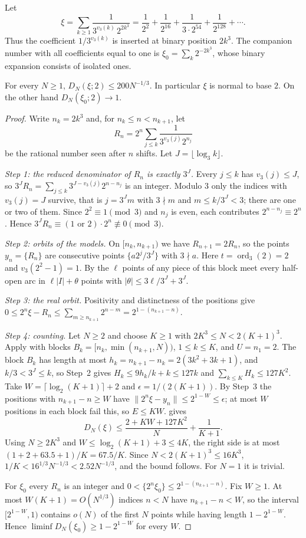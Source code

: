 \documentclass[11pt]{article}
\newcommand{\dist}[1]{\lVert #1\rVert}
\newcommand{\fr}[1]{\{#1\}}
\DeclareMathOperator{\ord}{ord}
\begin{document}
Let
\[
\xi=\sum_{k\ge1}\frac{1}{3^{v_3(k)}\,2^{2k^3}}
=\frac1{2^{2}}+\frac1{2^{16}}+\frac1{3\cdot2^{54}}+\frac1{2^{128}}+\cdots .
\]
Thus the coefficient $1/3^{v_3(k)}$ is inserted at binary position $2k^3$. The companion number
with all coefficients equal to one is $\xi_0=\sum_k2^{-2k^3}$, whose binary expansion consists of
isolated ones.

\begin{theorem}\label{thm:example}
For every $N\ge1$, $D_N(\xi;2)\le200N^{-1/3}$. In particular $\xi$ is normal to base $2$. On the
other hand $D_N(\xi_0;2)\to1$.
\end{theorem}

\begin{proof}
Write $n_k=2k^3$ and, for $n_k\le n<n_{k+1}$, let
\[
R_n=2^n\sum_{j\le k}\frac{1}{3^{v_3(j)}2^{n_j}}
\]
be the rational number seen after $n$ shifts. Let $J=\lfloor\log_3k\rfloor$.

\emph{Step 1: the reduced denominator of $R_n$ is exactly $3^J$.} Every $j\le k$ has
$v_3(j)\le J$, so $3^JR_n=\sum_{j\le k}3^{J-v_3(j)}2^{n-n_j}$ is an integer. Modulo $3$ only the
indices with $v_3(j)=J$ survive, that is $j=3^Jm$ with $3\nmid m$ and $m\le k/3^J<3$; there are one
or two of them. Since $2^2\equiv1\pmod3$ and $n_j$ is even, each contributes $2^{n-n_j}\equiv2^n$.
Hence $3^JR_n\equiv(1\text{ or }2)\cdot2^n\not\equiv0\pmod3$.

\emph{Step 2: orbits of the models.} On $[n_k,n_{k+1})$ we have $R_{n+1}=2R_n$, so the points
$y_n=\fr{R_n}$ are consecutive points $\fr{a2^j/3^J}$ with $3\nmid a$. Here $t=\ord_3(2)=2$ and
$v_3(2^2-1)=1$. By  the $\ell$ points of any piece of this block meet every
half-open arc in $\ell|I|+\theta$ points with $|\theta|\le3\ell/3^J+3^J$.

\emph{Step 3: the real orbit.} Positivity and distinctness of the positions give
$0\le2^n\xi-R_n\le\sum_{m\ge n_{k+1}}2^{n-m}=2^{1-(n_{k+1}-n)}$.

\emph{Step 4: counting.} Let $N\ge2$ and choose $K\ge1$ with $2K^3\le N<2(K+1)^3$. Apply
 with blocks $B_k=[n_k,\min(n_{k+1},N))$, $1\le k\le K$, and $U=n_1=2$. The
block $B_k$ has length at most $h_k=n_{k+1}-n_k=2(3k^2+3k+1)$, and $k/3<3^{J}\le k$, so Step~2 gives
$H_k\le9h_k/k+k\le127k$ and $\sum_{k\le K}H_k\le127K^2$. Take
$W=\lceil\log_2(K+1)\rceil+2$ and $\epsilon=1/(2(K+1))$. By Step~3 the positions with
$n_{k+1}-n\ge W$ have $\dist{2^n\xi-y_n}\le2^{1-W}\le\epsilon$; at most $W$ positions in each
block fail this, so $E\le KW$.  gives
\[
D_N(\xi)\le\frac{2+KW+127K^2}{N}+\frac1{K+1}.
\]
Using $N\ge2K^3$ and $W\le\log_2(K+1)+3\le4K$, the right side is at most
$(1+2+63.5+1)/K=67.5/K$. Since $N<2(K+1)^3\le16K^3$, $1/K<16^{1/3}N^{-1/3}<2.52N^{-1/3}$, and the
bound follows. For $N=1$ it is trivial.

For $\xi_0$ every $R_n$ is an integer and $0<\fr{2^n\xi_0}\le2^{1-(n_{k+1}-n)}$. Fix $W\ge1$. At
most $W(K+1)=O(N^{1/3})$ indices $n<N$ have $n_{k+1}-n<W$, so the interval $[2^{1-W},1)$ contains
$o(N)$ of the first $N$ points while having length $1-2^{1-W}$. Hence
$\liminf D_N(\xi_0)\ge1-2^{1-W}$ for every $W$.
\end{proof}
\end{document}
